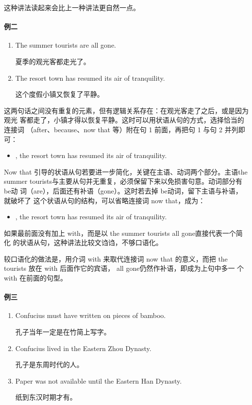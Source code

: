 这种讲法读起来会比上一种讲法更自然一点。

\paragraph{例二}

\begin{enumerate}
\item The summer tourists are all gone.

  夏季的观光客都走光了。
\item The resort town has resumed its air of tranquility.

  这个度假小镇又恢复了平静。
\end{enumerate}

这两句话之间没有重复的元素，但有逻辑关系存在：在观光客走了之后，或是因为观光
客都走了，小镇才得以恢复平静。这时可以用状语从句的方式，选择恰当的连接词
（after、because、now that 等）附在句 1 前面，再把句 1 与句 2 并列即可：
\begin{itemize}
\item {}, the resort town has
  resumed its air of tranquility.
\end{itemize}
Now that 引导的状语从句若要进一步简化，关键在主语、动词两个部分。主语the
summer tourists与主要从句并无重复，必须保留下来以免损害句意。动词部分有 be动
词（are），后面还有补语（gone）。这时若去掉 be动词，留下主语与补语，就破坏了
这个状语从句的结构，可以省略连接词 now that，成为：
\begin{itemize}
\item {}, the resort town has resumed its air of tranquility.
\end{itemize}
如果最前面没有加上 with，而是以 the summer tourists all gone直接代表一个简化
的状语从句，这种讲法比较文诌诌，不够口语化。

较口语化的做法是，用介词 with 来取代连接词 now that 的意义，而把 the
tourists 放在 with 后面作它的宾语， all gone仍然作补语，即成为上句中多一
个 with 在前面的句型。

\paragraph{例三}

\begin{enumerate}
\item Confucius must have written on pieces of bamboo.

  孔子当年一定是在竹简上写字。
\item Confucius lived in the Eastern Zhou Dynasty.

  孔子是东周时代的人。
\item Paper was not available until the Eastern Han Dynasty.

  纸到东汉时期才有。
\end{enumerate}

